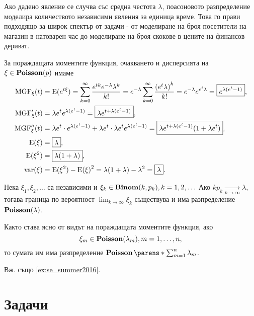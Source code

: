 \documentclass{../../common/topic}
\begin{document}
Ако дадено явление се случва със средна честота \( \lambda \), поасоновото разпределение моделира количеството независими явления за единица време. Това го прави подходящо за широк спектър от задачи - от моделиране на броя посетители на магазин в натоварен час до моделиране на броя скокове в цените на финансов дериват.

За пораждащата моментите функция, очакването и дисперсията на \( \xi \in \operatorname{\mathbf{Poisson}}(p) \) имаме
\begingroup
\allowdisplaybreaks
\begin{align*}
  \operatorname{MGF}_\xi(t)
  &=
  \operatorname{E}(e^{t\xi})
  =
  \sum_{k=0}^\infty \frac{e^{tk} e^{-\lambda} \lambda^k} {k!}
  =
  e^{-\lambda} \sum_{k=0}^\infty \frac{{(e^t \lambda)}^k} {k!}
  =
  e^{-\lambda} e^{e^t \lambda}
  =
  \boxed{e^{\lambda (e^t - 1)}},
  \\
  \operatorname{MGF}'_\xi(t)
  &=
  \lambda e^t e^{\lambda (e^t - 1)}
  =
  \boxed{\lambda e^{t + \lambda (e^t - 1)}},
  \\
  \operatorname{MGF}''_\xi(t)
  &=
  \lambda e^t \cdot e^{\lambda (e^t - 1)} + \lambda e^t \cdot \lambda e^t e^{\lambda (e^t - 1)}
  =
  \boxed{\lambda e^{t + \lambda (e^t - 1)} (1 + \lambda e^t)},
  \\
  \operatorname{E}(\xi)
  &=
  \boxed{\lambda},
  \\
  \operatorname{E}(\xi^2)
  &=
  \boxed{\lambda(1 + \lambda)},
  \\
  \operatorname{var}(\xi)
  &=
  \operatorname{E}(\xi^2) - {\operatorname{E}(\xi)}^2
  =
  \lambda(1 + \lambda) - \lambda^2
  =
  \boxed{\lambda}.
\end{align*}
\endgroup

\begin{theorem}[Поасон]\label{thm:poisson}
  Нека \( \xi_1, \xi_2, \ldots \) са независими и \( \xi_k \in \operatorname{\mathbf{Binom}}(k, p_k), k = 1, 2, \ldots \) Ако \( k p_k \xrightarrow[k \to \infty]{} \lambda \), тогава граница по вероятност \( \lim_{k \to \infty} \xi_k \) съществува и има разпределение \( \operatorname{\mathbf{Poisson}}(\lambda) \).
\end{theorem}

Както става ясно от видът на пораждащата моментите функция, ако
\begin{equation*}
  \xi_m \in \operatorname{\mathbf{Poisson}}(\lambda_m), m = 1, \ldots, n,
\end{equation*}
то сумата им има разпределение \( \distr{Poisson}\parens*{\sum_{m=1}^n \lambda_m } \).

Вж. също \cref{ex:se_summer2016}.

\section{Задачи}
\end{document}
